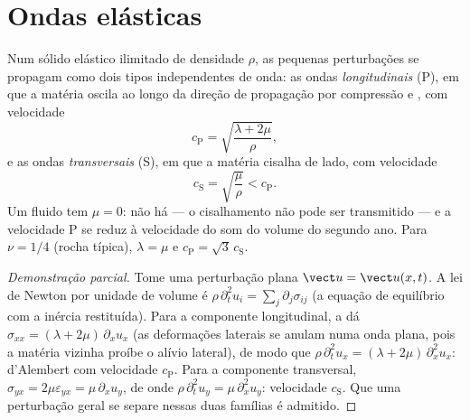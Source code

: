 \section{Ondas elásticas}

\begin{proposition}\label{prop:b3:continuum-elasticity:waves}
Num sólido elástico ilimitado de densidade $\rho$, as pequenas
perturbações se propagam como dois tipos independentes de onda: as
ondas \emph{longitudinais} (P), em que a matéria oscila ao longo da
direção de propagação por compressão e , com velocidade
\[
c_{\text{P}} = \sqrt{\frac{\lambda + 2\mu}{\rho}} ,
\]
e as ondas \emph{transversais} (S), em que a matéria cisalha de lado, com
velocidade
\[
c_{\text{S}} = \sqrt{\frac{\mu}{\rho}} < c_{\text{P}} .
\]
Um fluido tem $\mu = 0$: não há  --- o cisalhamento não pode ser
transmitido --- e a velocidade P se reduz à velocidade do som do volume
do segundo ano. Para $\nu = 1/4$ (rocha típica), $\lambda = \mu$ e $c_{\text{P}} =
\sqrt3\,c_{\text{S}}$.
\end{proposition}

\begin{proof}[Demonstração parcial]
Tome uma perturbação plana $\vect u = \vect u(x, t)$. A lei de Newton
por unidade de volume é $\rho\,\partial_t^2u_i = \sum_j\partial_j\sigma_{ij}$
(a equação de equilíbrio com a inércia restituída). Para a componente
longitudinal, a  dá $\sigma_{xx} = (\lambda +
2\mu)\,\partial_xu_x$ (as deformações laterais se anulam numa onda
plana, pois a matéria vizinha proíbe o alívio lateral), de modo que
$\rho\,\partial_t^2u_x = (\lambda + 2\mu)\,\partial_x^2u_x$:
d'Alembert com velocidade $c_{\text{P}}$. Para a componente
transversal, $\sigma_{yx} =
2\mu\varepsilon_{yx} = \mu\,\partial_xu_y$, de onde
$\rho\,\partial_t^2u_y = \mu\,\partial_x^2u_y$: velocidade $c_{\text{S}}$.
Que uma perturbação geral se separe nessas duas famílias é admitido.
\end{proof}

